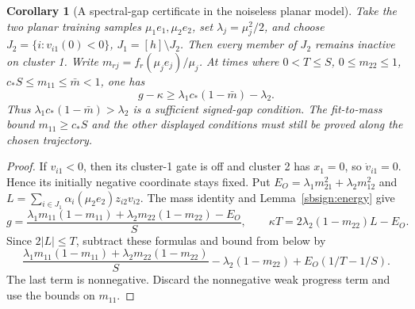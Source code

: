 \documentclass{article} %
\theoremstyle{plain}
\newtheorem{corollary}[theorem]{Corollary}
\theoremstyle{definition}
\theoremstyle{remark}
\begin{document}
\begin{corollary}[A spectral-gap certificate in the noiseless planar model]
\label{sbsign:spectral}
Take the two planar training samples $\mu_1e_1,\mu_2e_2$, set
$\lambda_j=\mu_j^2/2$, and choose
$J_2=\{i:v_{i1}(0)<0\}$, $J_1=[h]\setminus J_2$.
Then every member of $J_2$ remains inactive on cluster 1.
Write $m_{rj}=f_r(\mu_je_j)/\mu_j$.
At times where $0<T\le S$, $0\le m_{22}\le1$,
$c_*S\le m_{11}\le\bar m<1$, one has
\[
 g-\kappa\ge\lambda_1c_*(1-\bar m)-\lambda_2.
\]
Thus $\lambda_1c_*(1-\bar m)>\lambda_2$ is a sufficient signed-gap
condition. The fit-to-mass bound $m_{11}\ge c_*S$ and the other displayed
conditions must still be proved along the chosen trajectory.
\end{corollary}
\begin{proof}
If $v_{i1}<0$, then its cluster-1 gate is off and cluster 2 has $x_1=0$,
so $\dot v_{i1}=0$. Hence its initially negative coordinate stays fixed.
Put $E_O=\lambda_1m_{21}^2+\lambda_2m_{12}^2$ and
$L=\sum_{i\in J_1}\alpha_i(\mu_2e_2)z_{i2}v_{i2}$.
The mass identity and Lemma~\ref{sbsign:energy} give
\[
 g=\frac{\lambda_1m_{11}(1-m_{11})+
               \lambda_2m_{22}(1-m_{22})-E_O}{S},
 \qquad
 \kappa T=2\lambda_2(1-m_{22})L-E_O.
\]
Since $2|L|\le T$, subtract these formulas and bound from below by
\[
 \frac{\lambda_1m_{11}(1-m_{11})+
                  \lambda_2m_{22}(1-m_{22})}{S}
       -\lambda_2(1-m_{22})+E_O(1/T-1/S).
\]
The last term is nonnegative. Discard the nonnegative weak progress
term and use the bounds on $m_{11}$.
\end{proof}
\end{document}
